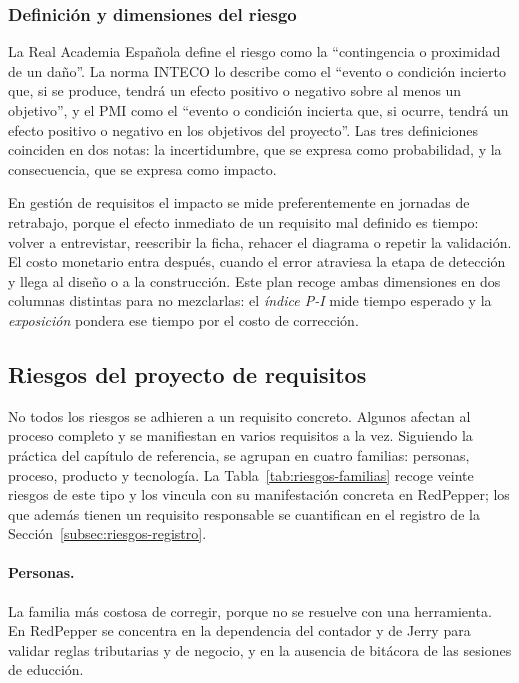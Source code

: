 \subsubsection{Definición y dimensiones del riesgo}
\label{subsubsec:riesgos-definicion}

La Real Academia Española define el riesgo como la \enquote{contingencia o
proximidad de un daño}. La norma INTECO lo describe como el \enquote{evento
o condición incierto que, si se produce, tendrá un efecto positivo o
negativo sobre al menos un objetivo}, y el PMI como el \enquote{evento o
condición incierta que, si ocurre, tendrá un efecto positivo o negativo en
los objetivos del proyecto}. Las tres definiciones coinciden en dos notas:
la incertidumbre, que se expresa como probabilidad, y la consecuencia, que
se expresa como impacto.

En gestión de requisitos el impacto se mide preferentemente en jornadas de
retrabajo, porque el efecto inmediato de un requisito mal definido es
tiempo: volver a entrevistar, reescribir la ficha, rehacer el diagrama o
repetir la validación. El costo monetario entra después, cuando el error
atraviesa la etapa de detección y llega al diseño o a la construcción. Este
plan recoge ambas dimensiones en dos columnas distintas para no mezclarlas:
el \emph{índice P-I} mide tiempo esperado y la \emph{exposición} pondera
ese tiempo por el costo de corrección.

\subsection{Riesgos del proyecto de requisitos}
\label{subsec:riesgos-familias}

No todos los riesgos se adhieren a un requisito concreto. Algunos afectan al
proceso completo y se manifiestan en varios requisitos a la vez. Siguiendo la
práctica del capítulo de referencia, se agrupan en cuatro familias:
personas, proceso, producto y tecnología. La
Tabla~\ref{tab:riesgos-familias} recoge veinte riesgos de este tipo y los
vincula con su manifestación concreta en RedPepper; los que además tienen un
requisito responsable se cuantifican en el registro de la
Sección~\ref{subsec:riesgos-registro}.

\paragraph{Personas.} La familia más costosa de corregir, porque no se
resuelve con una herramienta. En RedPepper se concentra en la dependencia
del contador y de Jerry para validar reglas tributarias y de negocio, y en
la ausencia de bitácora de las sesiones de educción.

